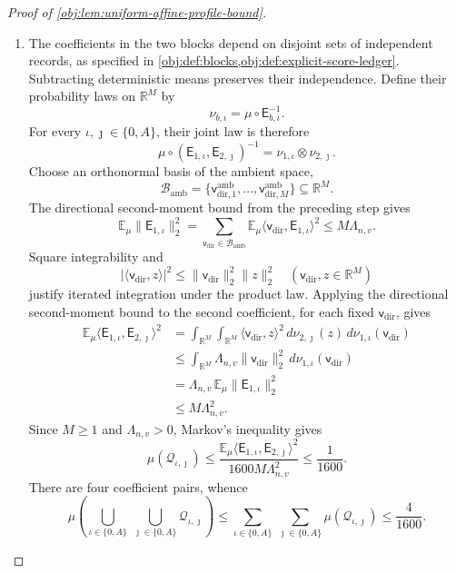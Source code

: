 \documentclass[11pt]{article}
\begin{document}
\begin{proof}[Proof of \cref{obj:lem:uniform-affine-profile-bound}]
\begin{enumerate}
\item
The coefficients in the two blocks depend on disjoint sets of independent records, as specified in \cref{obj:def:blocks,obj:def:explicit-score-ledger}. Subtracting deterministic means preserves their independence. Define their probability laws on \(\mathbb R^M\) by
\[
\nu_{b,\iota}
=
\mu\circ\mathsf E_{b,\iota}^{-1}.
\]
For every \(\iota,\jmath\in\{0,A\}\), their joint law is therefore
\[
\mu\circ
(\mathsf E_{1,\iota},\mathsf E_{2,\jmath})^{-1}
=
\nu_{1,\iota}\otimes\nu_{2,\jmath}.
\]
Choose an orthonormal basis of the ambient space,
\[
\mathcal B_{\mathrm{amb}}
=
\{\mathsf v^{\mathrm{amb}}_{\mathrm{dir},1},\ldots,\mathsf v^{\mathrm{amb}}_{\mathrm{dir},M}\}
\subseteq\mathbb R^M.
\]
The directional second-moment bound from the preceding step gives
\[
\mathbb E_\mu\|\mathsf E_{1,\iota}\|_2^2
=
\sum_{\mathsf v_{\mathrm{dir}}\in\mathcal B_{\mathrm{amb}}}
\mathbb E_\mu\langle \mathsf v_{\mathrm{dir}},\mathsf E_{1,\iota}\rangle^2
\le M\Lambda_{n,v}.
\]
Square integrability and
\[
|\langle \mathsf v_{\mathrm{dir}},z\rangle|^2\le\|\mathsf v_{\mathrm{dir}}\|_2^2\|z\|_2^2
\quad(\mathsf v_{\mathrm{dir}},z\in\mathbb R^M)
\]
justify iterated integration under the product law. Applying the directional second-moment bound to the second coefficient, for each fixed \(\mathsf v_{\mathrm{dir}}\), gives
\[
\begin{aligned}
\mathbb E_\mu
\langle\mathsf E_{1,\iota},\mathsf E_{2,\jmath}\rangle^2
&=
\int_{\mathbb R^M}\int_{\mathbb R^M}
\langle \mathsf v_{\mathrm{dir}},z\rangle^2\,
d\nu_{2,\jmath}(z)\,d\nu_{1,\iota}(\mathsf v_{\mathrm{dir}})\\
&\le
\int_{\mathbb R^M}
\Lambda_{n,v}\|\mathsf v_{\mathrm{dir}}\|_2^2\,d\nu_{1,\iota}(\mathsf v_{\mathrm{dir}})\\
&=
\Lambda_{n,v}\,
\mathbb E_\mu\|\mathsf E_{1,\iota}\|_2^2\\
&\le M\Lambda_{n,v}^2.
\end{aligned}
\]
Since \(M\ge1\) and \(\Lambda_{n,v}>0\), Markov's inequality gives
\[
\mu(\mathcal Q_{\iota,\jmath})
\le
\frac{
\mathbb E_\mu
\langle\mathsf E_{1,\iota},\mathsf E_{2,\jmath}\rangle^2
}{
1600M\Lambda_{n,v}^2
}
\le\frac1{1600}.
\]
There are four coefficient pairs, whence
\[
\mu\left(
\bigcup_{\iota\in\{0,A\}}\ \bigcup_{\jmath\in\{0,A\}}
\mathcal Q_{\iota,\jmath}
\right)
\le
\sum_{\iota\in\{0,A\}}\ \sum_{\jmath\in\{0,A\}}
\mu(\mathcal Q_{\iota,\jmath})
\le\frac4{1600}.
\]


\end{enumerate}
\end{proof}
\end{document}
